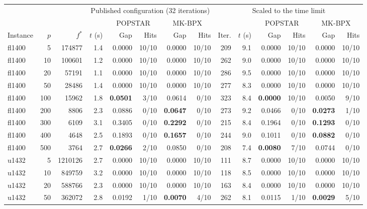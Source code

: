 \begin{tabular}{lrr@{\hskip 10pt}rrrrr@{\hskip 10pt}rrrrrr}
\toprule
 & & & \multicolumn{5}{c}{Published configuration (32 iterations)} & \multicolumn{6}{c}{Scaled to the time limit} \\
\cmidrule(lr){4-8}\cmidrule(lr){9-14}
 & & & & \multicolumn{2}{c}{POPSTAR} & \multicolumn{2}{c}{MK-BPX} & & & \multicolumn{2}{c}{POPSTAR} & \multicolumn{2}{c}{MK-BPX} \\
\cmidrule(lr){5-6}\cmidrule(lr){7-8}\cmidrule(lr){11-12}\cmidrule(lr){13-14}
Instance & $p$ & $f^*$ & $t$ (s) & Gap & Hits & Gap & Hits & Iter. & $t$ (s) & Gap & Hits & Gap & Hits \\
\midrule
fl1400 & 5 & 174877 & 1.4 & 0.0000 & 10/10 & 0.0000 & 10/10 & 209 & 9.1 & 0.0000 & 10/10 & 0.0000 & 10/10 \\
fl1400 & 10 & 100601 & 1.2 & 0.0000 & 10/10 & 0.0000 & 10/10 & 262 & 9.0 & 0.0000 & 10/10 & 0.0000 & 10/10 \\
fl1400 & 20 & 57191 & 1.1 & 0.0000 & 10/10 & 0.0000 & 10/10 & 286 & 9.5 & 0.0000 & 10/10 & 0.0000 & 10/10 \\
fl1400 & 50 & 28486 & 1.4 & 0.0000 & 10/10 & 0.0000 & 10/10 & 277 & 8.3 & 0.0000 & 10/10 & 0.0000 & 10/10 \\
fl1400 & 100 & 15962 & 1.8 & \textbf{0.0501} & 3/10 & 0.0614 & 0/10 & 323 & 8.4 & \textbf{0.0000} & 10/10 & 0.0050 & 9/10 \\
fl1400 & 200 & 8806 & 2.3 & 0.0886 & 0/10 & \textbf{0.0647} & 0/10 & 273 & 9.2 & 0.0466 & 0/10 & \textbf{0.0273} & 1/10 \\
fl1400 & 300 & 6109 & 3.1 & 0.3405 & 0/10 & \textbf{0.2292} & 0/10 & 215 & 8.4 & 0.1964 & 0/10 & \textbf{0.1293} & 0/10 \\
fl1400 & 400 & 4648 & 2.5 & 0.1893 & 0/10 & \textbf{0.1657} & 0/10 & 244 & 9.0 & 0.1011 & 0/10 & \textbf{0.0882} & 0/10 \\
fl1400 & 500 & 3764 & 2.7 & \textbf{0.0266} & 2/10 & 0.0850 & 0/10 & 208 & 7.4 & \textbf{0.0080} & 7/10 & 0.0744 & 0/10 \\
\addlinespace[2pt]
u1432 & 5 & 1210126 & 2.7 & 0.0000 & 10/10 & 0.0000 & 10/10 & 111 & 8.7 & 0.0000 & 10/10 & 0.0000 & 10/10 \\
u1432 & 10 & 849759 & 3.2 & 0.0000 & 10/10 & 0.0000 & 10/10 & 118 & 8.5 & 0.0000 & 10/10 & 0.0000 & 10/10 \\
u1432 & 20 & 588766 & 2.3 & 0.0000 & 10/10 & 0.0000 & 10/10 & 163 & 8.4 & 0.0000 & 10/10 & 0.0000 & 10/10 \\
u1432 & 50 & 362072 & 2.8 & 0.0192 & 1/10 & \textbf{0.0070} & 4/10 & 262 & 8.1 & 0.0115 & 1/10 & \textbf{0.0029} & 5/10 \\

\end{tabular}
